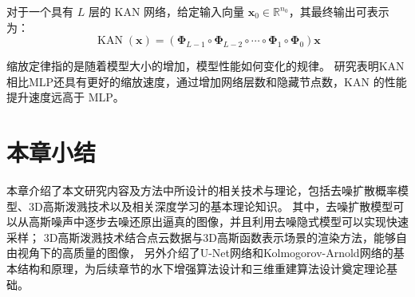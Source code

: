 对于一个具有 $L$ 层的 KAN 网络，给定输入向量 $\mathbf{x}_0 \in \mathbb{R}^{n_0}$，其最终输出可表示为：
\begin{equation}
    \operatorname{KAN}(\mathbf{x})=\left(\boldsymbol{\Phi}_{L-1} \circ \boldsymbol{\Phi}_{L-2} \circ \cdots \circ \boldsymbol{\Phi}_1 \circ \boldsymbol{\Phi}_0\right) \mathbf{x}
\end{equation}

缩放定律指的是随着模型大小的增加，模型性能如何变化的规律。
研究表明KAN相比MLP还具有更好的缩放速度，通过增加网络层数和隐藏节点数，KAN 的性能提升速度远高于 MLP。

\section{本章小结}
本章介绍了本文研究内容及方法中所设计的相关技术与理论，包括去噪扩散概率模型、3D高斯泼溅技术以及相关深度学习的基本理论知识。
其中，去噪扩散模型可以从高斯噪声中逐步去噪还原出逼真的图像，并且利用去噪隐式模型可以实现快速采样；
3D高斯泼溅技术结合点云数据与3D高斯函数表示场景的渲染方法，能够自由视角下的高质量的图像，
另外介绍了U-Net网络和Kolmogorov-Arnold网络的基本结构和原理，为后续章节的水下增强算法设计和三维重建算法设计奠定理论基础。
